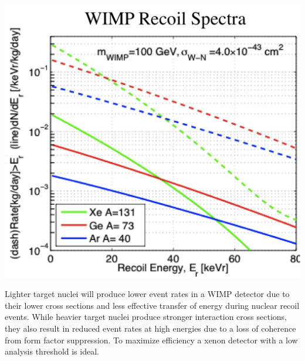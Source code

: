 \documentclass[a4paper,12pt]{article}
\begin{document}
\begin{center}
\includegraphics[scale=0.5]{Recoil-spectrum.png}
\end{center}

Lighter target nuclei will produce lower event rates in a WIMP detector due to their lower cross sections and less effective transfer of energy during nuclear recoil events. While heavier target nuclei produce stronger interaction cross sections, they also result in reduced event rates at high energies due to a loss of coherence from form factor suppression.  To maximize efficiency a xenon detector with a low analysis threshold is ideal.
\end{document}
